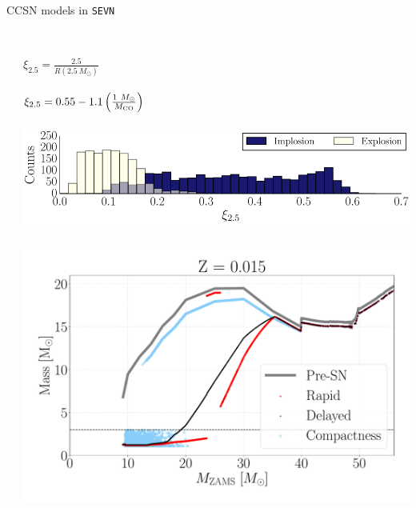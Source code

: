 \documentclass{beamer} %
\begin{document}
\begin{frame}[noframenumbering]{CCSN models in \texttt{SEVN}}
\begin{columns}
\begin{column}{0.4\textwidth}
		\end{column}
		\begin{column}{0.5\textwidth}
		\\
		$\xi_\mathrm{2.5}= \frac{2.5}{R(2.5 ~M_\odot)}$\\
		\\
		\medskip
		$\xi_{2.5} = 0.55 -1.1 \left(\frac{1~ M_\odot}{M_{\rm CO}}\right)$\\
		\\
		\medskip
		\includegraphics[width=\textwidth]{./images/compactness.png}\\
		\\
		\includegraphics[width=\textwidth]{./images/remnants_Z015_cut.pdf}
		\end{column}	
	\end{columns}
\end{frame}
\end{document}
